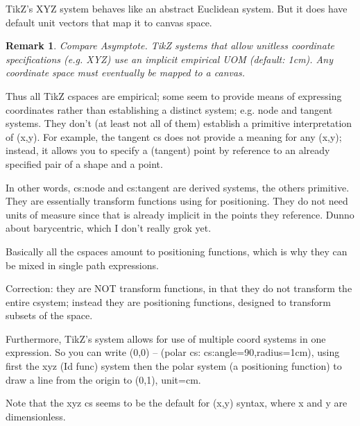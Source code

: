 \documentclass[12pt]{tufte-handout}
\numberwithin{equation}{subsection}
\numberwithin{equation}{subsection}
\newtheorem{remark}{Remark}
\newcommand\cspace{coordinate space}
\begin{document}
\begin{appendices}
                TikZ's XYZ system behaves like an abstract Euclidean system.  But it
                does have default unit vectors that map it to canvas space.

                \begin{remark}
                  Compare Asymptote.  TikZ systems that allow unitless coordinate
                  specifications (e.g. XYZ) use an implicit empirical UOM (default:
                  1cm).  Any \cspace{} must eventually be mapped to a canvas.
                \end{remark}

                Thus all TikZ cspaces are empirical; some seem to provide means of
                expressing coordinates rather than establishing a distinct system;
                e.g. node and tangent systems.  They don't (at least not all of them)
                establish a primitive interpretation of (x,y).  For example, the
                tangent cs does not provide a meaning for any (x,y); instead, it
                allows you to specify a (tangent) point by reference to an already
                specified pair of a shape and a point.

                In other words, cs:node and cs:tangent are derived systems, the others
                primitive.  They are essentially transform functions using for
                positioning.  They do not need units of measure since that is already
                implicit in the points they reference.  Dunno about barycentric, which
                I don't really grok yet.

                Basically all the cspaces amount to positioning functions, which is
                why they can be mixed in single path expressions.

                Correction: they are NOT transform functions, in that they do not
                transform the entire csystem; instead they are positioning functions,
                designed to transform subsets of the space.

                Furthermore, TikZ's system allows for use of multiple coord systems in
                one expression.  So you can write (0,0) -- (polar cs:
                cs:angle=90,radius=1cm), using first the xyz (Id func) system then the
                polar system (a positioning function) to draw a line from the origin
                to (0,1), unit=cm.

                Note that the xyz cs seems to be the default for (x,y) syntax, where x
                and y are dimensionless.


\end{appendices}
\end{document}
